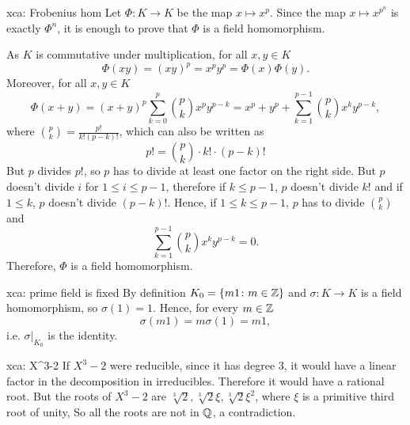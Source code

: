 \begin{sol}{xca: Frobenius hom}
Let $\Phi: K\to K$ be the map 
$x\mapsto x^{p}$.
Since the map $x\mapsto x^{p^n}$
is exactly $\Phi^n$,
it is enough to prove that $\Phi$ is a field homomorphism.

As $K$ is commutative under multiplication, 
for all $x,y \in K$ 
        \[
        \Phi(xy) = (xy)^p = x^py^p = \Phi(x) \Phi(y).
        \]
Moreover, for all $x,y \in K$ 
\[
\Phi(x+y) =
(x+y)^p \sum_{k=0}^p \binom{p}{k}x^py^{p-k}=
x^p + y^p + \sum_{k=1}^{p-1} \binom{p}{k}x^ky^{p-k} ,
\]
where $\binom{p}{k} = \frac{p!}{k!(p-k)!}$,
which can also be written as
        \[
        p! = \binom{p}{k} \cdot k! \cdot (p-k)!
        \]
But $p$ divides $p!$, so $p$
has to divide at least one 
factor on the right side. 
But $p$ doesn't divide $i$
 for $1 \leq i \leq p-1$, therefore if $k \leq p-1$, $p$ doesn't divide
$k!$ and if $1 \leq  k$, $p$ doesn't divide $(p-k)!$. 
Hence, if $1 \leq k \leq p-1$, $p$ has to divide $\binom{p}{k}$ and 
\[
\sum_{k=1}^{p-1} \binom{p}{k}x^ky^{p-k}=0.
\]
Therefore, $\Phi$ is a field homomorphism.
\end{sol}

\begin{sol}{xca: prime field is fixed}
    By definition $K_0=\{m1\colon m\in \mathbb{Z}\}$ and 
    $\sigma:K\to K$ is a field homomorphism,
    so $\sigma(1)=1$.
    Hence, for every $m\in\mathbb{Z}$
    \[
    \sigma(m1)=m\sigma(1)=m1,
    \]
    i.e. $\sigma|_{K_0}$ is the identity.
\end{sol}

\begin{sol}{xca: X^3-2}
    If $X^3-2$ were reducible, since it has degree 3,
    it would have a linear
    factor in the decomposition in irreducibles.
    Therefore it would have a rational root.
    But the roots of $X^3-2$ are $\sqrt[3]{2},\sqrt[3]{2}\xi,\sqrt[3]{2}\xi^2$,
    where $\xi$ is a primitive third root of unity,
    So all the roots are not in $\mathbb{Q}$, a contradiction.
\end{sol}

